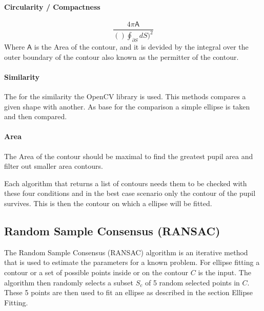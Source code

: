     \paragraph{Circularity / Compactness}
    \begin{equation}
        \frac{4\pi\mathsf{A} }{()\oint_{\partial S} dS)^2}
    \end{equation}
    Where $\mathsf{A} $ is the Area of the contour, and it is devided by the integral over the outer boundary of the contour also known as the permitter of the contour.

    \paragraph{Similarity }
    The for the similarity the OpenCV library is used. This methods compares a given shape with another. As base for the comparison a simple ellipse is taken and then compared.

    \paragraph{Area}
    The Area of the contour should be maximal to find the greatest pupil area and filter out smaller area contours. 

   Each algorithm that returns a list of contours needs them to be checked with these four conditions and in the best case scenario only the contour of the pupil survives. This is then the contour on which a ellipse will be fitted. 


\subsection{Random Sample Consensus (RANSAC)}
The Random Sample Consensus (RANSAC) algorithm is an iterative method that is used to estimate the parameters for a known problem. For ellipse fitting a contour or a set of possible points inside or on the contour $C$ is the input. The algorithm then randomly selects a subset $S_c$ of 5 random selected points in $C$. 
These 5 points are then used to fit an ellipse as described in the section Ellipse Fitting.

